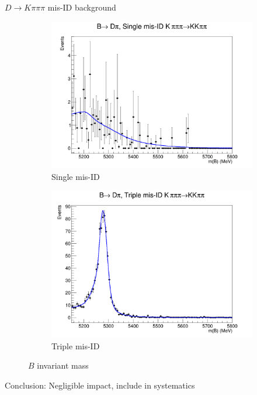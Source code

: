 \documentclass{beamer}
\begin{document}
\begin{frame}{$D\to K\pi\pi\pi$ mis-ID background}
  \begin{figure}
    \centering
    \begin{subfigure}{0.5\textwidth}
      \includegraphics[width = 1.0\textwidth]{Plots/Kpipipi_SingleMisID_Dpi_BMass.png}
      \caption{Single mis-ID}
    \end{subfigure}%
    \begin{subfigure}{0.5\textwidth}
      \includegraphics[width = 1.0\textwidth]{Plots/Kpipipi_TripleMisID_Dpi_BMass.png}
      \caption{Triple mis-ID}
    \end{subfigure}
    \caption{$B$ invariant mass}
  \end{figure}
  \begin{center}
    Conclusion: Negligible impact, include in systematics
  \end{center}
\end{frame}
\end{document}
